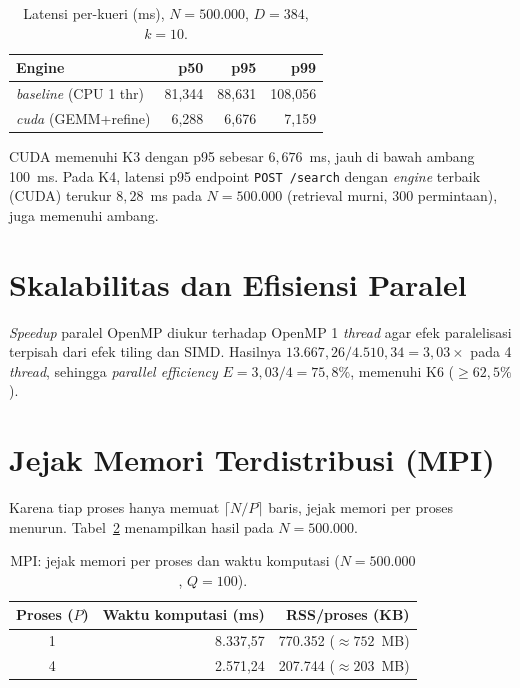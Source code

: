 \documentclass[12pt,a4paper,oneside]{report}
\begin{document}
\begin{table}[H]
\centering
\caption{Latensi per-kueri (ms), $N=500.000$, $D=384$, $k=10$.}
\label{tab:latency}
\begin{tabular}{@{}l r r r@{}}
\toprule
\textbf{Engine} & \textbf{p50} & \textbf{p95} & \textbf{p99}\\
\midrule
\textit{baseline} (CPU 1 thr) & 81,344 & 88,631 & 108,056\\
\textit{cuda} (GEMM+refine)   & 6,288  & 6,676  & 7,159\\
\bottomrule
\end{tabular}
\end{table}

CUDA memenuhi K3 dengan p95 sebesar $6{,}676$~ms, jauh di bawah ambang 100~ms. Pada K4, latensi p95 endpoint \texttt{POST /search} dengan \textit{engine} terbaik (CUDA) terukur $8{,}28$~ms pada $N=500.000$ (retrieval murni, 300 permintaan), juga memenuhi ambang.

\section{Skalabilitas dan Efisiensi Paralel}

\textit{Speedup} paralel OpenMP diukur terhadap OpenMP 1 \textit{thread} agar efek paralelisasi terpisah dari efek tiling dan SIMD. Hasilnya $13.667{,}26 / 4.510{,}34 = 3{,}03\times$ pada 4 \textit{thread}, sehingga \textit{parallel efficiency} $E = 3{,}03/4 = 75{,}8\%$, memenuhi K6 ($\geq 62{,}5\%$).

\section{Jejak Memori Terdistribusi (MPI)}

Karena tiap proses hanya memuat $\lceil N/P \rceil$ baris, jejak memori per proses menurun. Tabel~\ref{tab:mpi} menampilkan hasil pada $N=500.000$.

\begin{table}[H]
\centering
\caption{MPI: jejak memori per proses dan waktu komputasi ($N=500.000$, $Q=100$).}
\label{tab:mpi}
\begin{tabular}{@{}c r r@{}}
\toprule
\textbf{Proses ($P$)} & \textbf{Waktu komputasi (ms)} & \textbf{RSS/proses (KB)}\\
\midrule
1 & 8.337,57 & 770.352 ($\approx 752$~MB)\\
4 & 2.571,24 & 207.744 ($\approx 203$~MB)\\
\bottomrule
\end{tabular}
\end{table}
\end{document}
